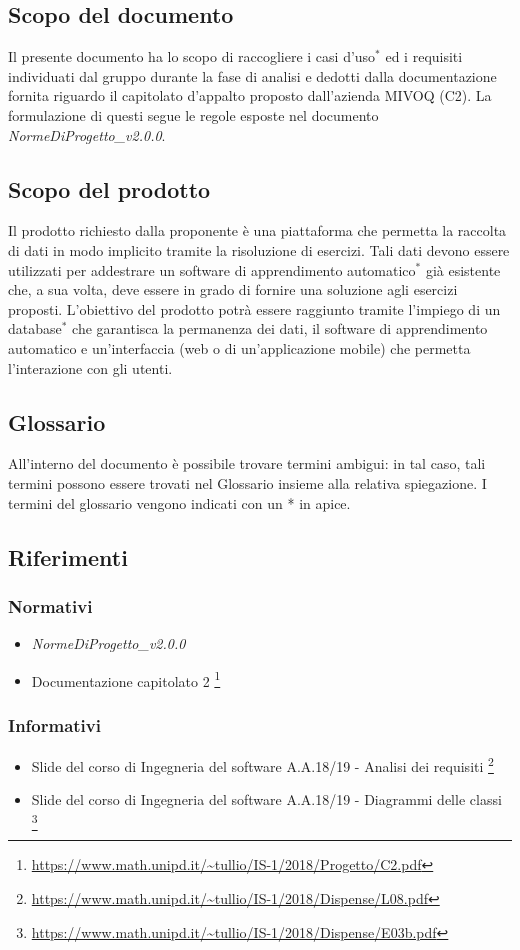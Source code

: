 \subsection{Scopo del documento}
	Il presente documento ha lo scopo di raccogliere i casi d'uso$^*$ ed i requisiti individuati dal gruppo durante la fase di analisi e dedotti dalla documentazione fornita riguardo il capitolato d'appalto proposto dall'azienda MIVOQ (C2). La formulazione di questi segue le regole esposte nel documento \textit{NormeDiProgetto\_v2.0.0}.

\subsection{Scopo del prodotto}
	Il prodotto richiesto dalla proponente è una piattaforma che permetta la raccolta di dati in modo implicito tramite la risoluzione di esercizi. Tali dati devono essere utilizzati per addestrare un software di apprendimento automatico$^*$ già esistente che, a sua volta, deve essere in grado di fornire una soluzione agli esercizi proposti. L'obiettivo del prodotto potrà essere raggiunto tramite l'impiego di un database$^*$ che garantisca la permanenza dei dati, il software di apprendimento automatico e un'interfaccia (web o di un'applicazione mobile) che permetta l'interazione con gli utenti.

\subsection{Glossario}
	All'interno del documento è possibile trovare termini ambigui: in tal caso, tali termini possono essere trovati nel Glossario insieme alla relativa spiegazione. I termini del glossario vengono indicati con un * in apice.
	
\subsection{Riferimenti}
	\subsubsection{Normativi}
	\begin{itemize}
		\item \textit{NormeDiProgetto\_v2.0.0}
		\item Documentazione capitolato 2 \footnote{\url{https://www.math.unipd.it/~tullio/IS-1/2018/Progetto/C2.pdf}}
	
	\end{itemize}
	\subsubsection{Informativi}
	\begin{itemize}
		\item Slide del corso di Ingegneria del software A.A.18/19 - Analisi dei requisiti \footnote{\url{https://www.math.unipd.it/~tullio/IS-1/2018/Dispense/L08.pdf}}
		\item Slide del corso di Ingegneria del software A.A.18/19 - Diagrammi delle classi \footnote{\url{https://www.math.unipd.it/~tullio/IS-1/2018/Dispense/E03b.pdf}}
	\end{itemize}
		